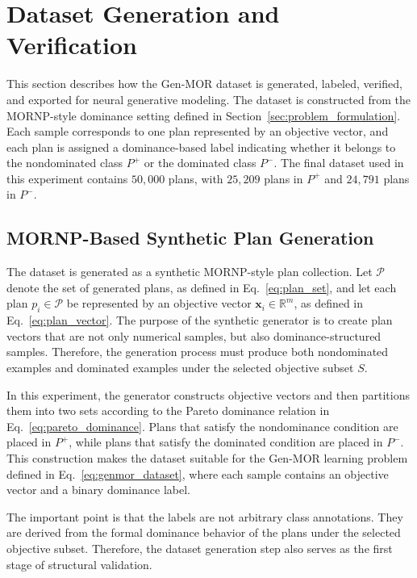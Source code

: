 \section{Dataset Generation and Verification}
\label{sec:dataset_generation}

This section describes how the Gen-MOR dataset is generated, labeled, verified, and exported for neural generative modeling. The dataset is constructed from the MORNP-style dominance setting defined in Section~\ref{sec:problem_formulation}. Each sample corresponds to one plan represented by an objective vector, and each plan is assigned a dominance-based label indicating whether it belongs to the nondominated class $P^{+}$ or the dominated class $P^{-}$. The final dataset used in this experiment contains $50{,}000$ plans, with $25{,}209$ plans in $P^{+}$ and $24{,}791$ plans in $P^{-}$.

\subsection{MORNP-Based Synthetic Plan Generation}
\label{subsec:mornp_based_generation}

The dataset is generated as a synthetic MORNP-style plan collection. Let $\mathcal{P}$ denote the set of generated plans, as defined in Eq.~\eqref{eq:plan_set}, and let each plan $p_i \in \mathcal{P}$ be represented by an objective vector $\mathbf{x}_i \in \mathbb{R}^{m}$, as defined in Eq.~\eqref{eq:plan_vector}. The purpose of the synthetic generator is to create plan vectors that are not only numerical samples, but also dominance-structured samples. Therefore, the generation process must produce both nondominated examples and dominated examples under the selected objective subset $S$.

In this experiment, the generator constructs objective vectors and then partitions them into two sets according to the Pareto dominance relation in Eq.~\eqref{eq:pareto_dominance}. Plans that satisfy the nondominance condition are placed in $P^{+}$, while plans that satisfy the dominated condition are placed in $P^{-}$. This construction makes the dataset suitable for the Gen-MOR learning problem defined in Eq.~\eqref{eq:genmor_dataset}, where each sample contains an objective vector and a binary dominance label.

The important point is that the labels are not arbitrary class annotations. They are derived from the formal dominance behavior of the plans under the selected objective subset. Therefore, the dataset generation step also serves as the first stage of structural validation.

